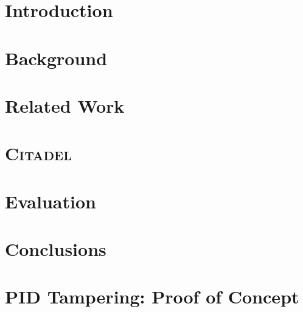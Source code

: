 \documentclass[a4paper,12pt,twoside,openright]{report}
\begin{document}
\pagestyle{empty}
\singlespacing
{}

\restoregeometry
\onehalfspacing

\singlespacing


\setcounter{page}{0}
\pagestyle{plain}
\tableofcontents
{}
\listoffigures
{}
\listoftables

\onehalfspacing

\raggedbottom

\chapter{Introduction}
\setcounter{page}{1} 


\chapter{Background} 
\label{sec:background}


\chapter{Related Work} 
\label{sec:related}


\chapter{\textsc{Citadel}}
\label{sec:design}


\chapter{Evaluation} 
\label{sec:eval}


\chapter{Conclusions}
\label{sec:conclusion}



\appendix
\singlespacing

\chapter{PID Tampering: Proof of Concept}
\label{appendix:pid-tampering}
\end{document}
